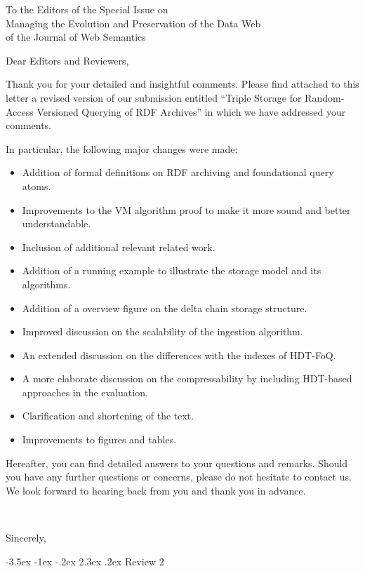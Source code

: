 \documentclass{letter}
\makeatletter
\newcounter{section}
\newcommand\section{\@startsection {section}{1}{\z@}%
                                   {-3.5ex \@plus -1ex \@minus -.2ex}%
                                   {2.3ex \@plus.2ex}%
                                   {\normalfont\Large\bfseries}}
\makeatother
\begin{document}
\begin{letter}{To the Editors of the Special Issue on\\Managing the Evolution and Preservation of the Data Web\\of the Journal of Web Semantics}
\opening{Dear Editors and Reviewers,}

{\parfillskip 0pt
Thank you for your detailed and insightful comments.
Please find attached to this letter a revised version of our submission entitled
\enquote{Triple Storage for Random-Access Versioned Querying of RDF Archives}
in which we have addressed your comments.
}

In particular, the following major changes were made:
\begin{itemize}
  \item Addition of formal definitions on RDF archiving and foundational query atoms.
  \item Improvements to the VM algorithm proof to make it more sound and better understandable.
  \item Inclusion of additional relevant related work.
  \item Addition of a running example to illustrate the storage model and its algorithms.
  \item Addition of a overview figure on the delta chain storage structure.
  \item Improved discussion on the scalability of the ingestion algorithm.
  \item An extended discussion on the differences with the indexes of HDT-FoQ.
  \item A more elaborate discussion on the compressability by including HDT-based approaches in the evaluation.
  \item Clarification and shortening of the text.
  \item Improvements to figures and tables.
\end{itemize}

{\parfillskip 0pt
Hereafter, you can find detailed answers to your questions and remarks.
Should you have any further questions or concerns, please do not hesitate to contact us.
We look forward to hearing back from you and thank you in advance.
}

\ \\

\closing{Sincerely,}

\pagebreak
\section{Review 2}


\end{letter}
\end{document}

